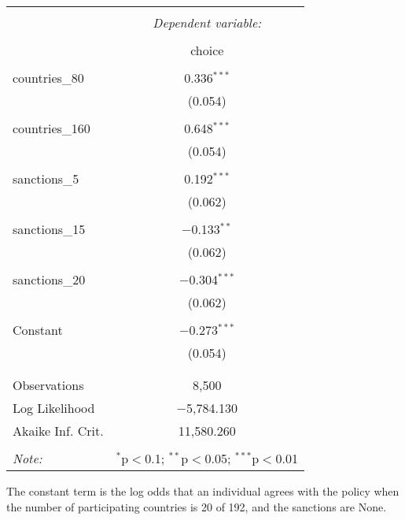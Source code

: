 \documentclass[12pt,letterpaper]{article}
\begin{document}
\begin{enumerate}
\begin{enumerate}
\begin{table}[!htbp] \centering 
	\caption{} 
	\label{} 
	\begin{tabular}{@{\extracolsep{5pt}}lc} 
		\\[-1.8ex]\hline 
		\hline \\[-1.8ex] 
		& \multicolumn{1}{c}{\textit{Dependent variable:}} \\ 
		\cline{2-2} 
		\\[-1.8ex] & choice \\ 
		\hline \\[-1.8ex] 
		countries\_80 & 0.336$^{***}$ \\ 
		& (0.054) \\ 
		& \\ 
		countries\_160 & 0.648$^{***}$ \\ 
		& (0.054) \\ 
		& \\ 
		sanctions\_5 & 0.192$^{***}$ \\ 
		& (0.062) \\ 
		& \\ 
		sanctions\_15 & $-$0.133$^{**}$ \\ 
		& (0.062) \\ 
		& \\ 
		sanctions\_20 & $-$0.304$^{***}$ \\ 
		& (0.062) \\ 
		& \\ 
		Constant & $-$0.273$^{***}$ \\ 
		& (0.054) \\ 
		& \\ 
		\hline \\[-1.8ex] 
		Observations & 8,500 \\ 
		Log Likelihood & $-$5,784.130 \\ 
		Akaike Inf. Crit. & 11,580.260 \\ 
		\hline 
		\hline \\[-1.8ex] 
		\textit{Note:}  & \multicolumn{1}{r}{$^{*}$p$<$0.1; $^{**}$p$<$0.05; $^{***}$p$<$0.01} \\ 
	\end{tabular} 
\end{table} 

\vspace{3cm}

The constant term is the log odds that an individual agrees with the policy when the number of participating countries is 20 of 192, and the sanctions are None.

\vspace{0.5cm}


\end{enumerate}
\end{enumerate}
\end{document}

